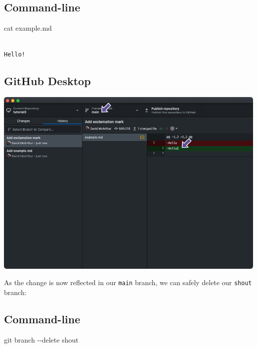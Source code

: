 \documentclass[
  letterpaper,
  DIV=11,
  numbers=noendperiod]{scrartcl}
\newenvironment{Shaded}{\begin{snugshade}}{\end{snugshade}}
\newcommand{\AttributeTok}[1]{\textcolor[rgb]{0.40,0.45,0.13}{#1}}
\newcommand{\FunctionTok}[1]{\textcolor[rgb]{0.28,0.35,0.67}{#1}}
\newcommand{\NormalTok}[1]{\textcolor[rgb]{0.00,0.23,0.31}{#1}}
\begin{document}
\subsection{Command-line}

\begin{Shaded}
\begin{Highlighting}[]
\FunctionTok{cat}\NormalTok{ example.md}
\end{Highlighting}
\end{Shaded}

\begin{verbatim}

Hello!
\end{verbatim}

\subsection{GitHub Desktop}

\includegraphics{images/image35.png}

As the change is now reflected in our \texttt{main} branch, we can
safely delete our \texttt{shout} branch:

\subsection{Command-line}

\begin{Shaded}
\begin{Highlighting}[]
\FunctionTok{git}\NormalTok{ branch }\AttributeTok{{-}{-}delete}\NormalTok{ shout}
\end{Highlighting}
\end{Shaded}
\end{document}
